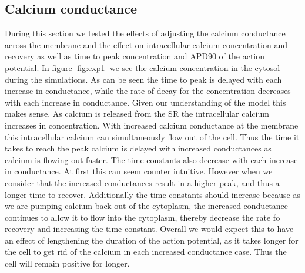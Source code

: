 \documentclass[11pt]{article}
\begin{document}
\subsection{Calcium conductance}
\par{}
During this section we tested the effects of adjusting the calcium conductance across the membrane and the effect on intracellular calcium concentration and recovery as well as time to peak concentration and APD90 of the action potential. In figure \ref{fig:exp1} we see the calcium concentration in the cytosol during the simulations. As can be seen the time to peak is delayed with each increase in conductance, while the rate of decay for the concentration decreases with each increase in conductance. Given our understanding of the model this makes sense. As calcium is released from the SR the intracellular calcium increases in concentration. With increased calcium conductance at the membrane this intracellular calcium can simultaneously flow out of the cell. Thus the time it takes to reach the peak calcium is delayed with increased conductances as calcium is flowing out faster. The time constants also decrease with each increase in conductance. At first this can seem counter intuitive. However when we consider that the increased conductances result in a higher peak, and thus a longer time to recover. Additionally the time constants should increase because as we are pumping calcium back out of the cytoplasm, the increased conductance continues to allow it to flow into the cytoplasm, thereby decrease the rate fo recovery and increasing the time constant. Overall we would expect this to have an effect of lengthening the duration of the action potential, as it takes longer for the cell to get rid of the calcium in each increased conductance case. Thus the cell will remain positive for longer.
\end{document}
